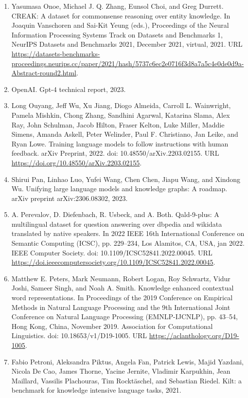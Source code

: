 \documentclass[11pt,UTF8,fontset=fandol]{ctexart}
\begin{document}
\begin{enumerate}[leftmargin=2em]
\item Yasumasa Onoe, Michael J. Q. Zhang, Eunsol Choi, and Greg Durrett. CREAK: A dataset for commonsense reasoning over entity knowledge. In Joaquin Vanschoren and Sai-Kit Yeung (eds.), Proceedings of the Neural Information Processing Systems Track on Datasets and Benchmarks 1, NeurIPS Datasets and Benchmarks 2021, December 2021, virtual, 2021. URL \url{https://datasets-benchmarks-proceedings.neurips.cc/paper/2021/hash/5737c6ec2e0716f3d8a7a5c4e0de0d9a-Abstract-round2.html}.
\item OpenAI. Gpt-4 technical report, 2023.
\item Long Ouyang, Jeff Wu, Xu Jiang, Diogo Almeida, Carroll L. Wainwright, Pamela Mishkin, Chong Zhang, Sandhini Agarwal, Katarina Slama, Alex Ray, John Schulman, Jacob Hilton, Fraser Kelton, Luke Miller, Maddie Simens, Amanda Askell, Peter Welinder, Paul F. Christiano, Jan Leike, and Ryan Lowe. Training language models to follow instructions with human feedback. arXiv Preprint, 2022. doi: 10.48550/arXiv.2203.02155. URL \url{https://doi.org/10.48550/arXiv.2203.02155}.
\item Shirui Pan, Linhao Luo, Yufei Wang, Chen Chen, Jiapu Wang, and Xindong Wu. Unifying large language models and knowledge graphs: A roadmap. arXiv preprint arXiv:2306.08302, 2023.
\item A. Perevalov, D. Diefenbach, R. Usbeck, and A. Both. Qald-9-plus: A multilingual dataset for question answering over dbpedia and wikidata translated by native speakers. In 2022 IEEE 16th International Conference on Semantic Computing (ICSC), pp. 229--234, Los Alamitos, CA, USA, jan 2022. IEEE Computer Society. doi: 10.1109/ICSC52841.2022.00045. URL \url{https://doi.ieeecomputersociety.org/10.1109/ICSC52841.2022.00045}.
\item Matthew E. Peters, Mark Neumann, Robert Logan, Roy Schwartz, Vidur Joshi, Sameer Singh, and Noah A. Smith. Knowledge enhanced contextual word representations. In Proceedings of the 2019 Conference on Empirical Methods in Natural Language Processing and the 9th International Joint Conference on Natural Language Processing (EMNLP-IJCNLP), pp. 43--54, Hong Kong, China, November 2019. Association for Computational Linguistics. doi: 10.18653/v1/D19-1005. URL \url{https://aclanthology.org/D19-1005}.
\item Fabio Petroni, Aleksandra Piktus, Angela Fan, Patrick Lewis, Majid Yazdani, Nicola De Cao, James Thorne, Yacine Jernite, Vladimir Karpukhin, Jean Maillard, Vassilis Plachouras, Tim Rockt\"{a}schel, and Sebastian Riedel. Kilt: a benchmark for knowledge intensive language tasks, 2021.

\end{enumerate}
\end{document}
